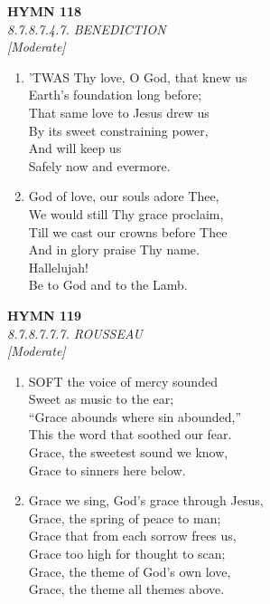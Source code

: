 \newpage
\begin{center}
    {\Large \textbf{HYMN 118}}
    \\
    \textit{8.7.8.7.4.7. BENEDICTION}
    \\
    \textit{\small [Moderate]}
\end{center}
\vspace{1em}

\begin{enumerate}
    \item 'TWAS Thy love, O God, that knew us \\
        Earth's foundation long before; \\
        That same love to Jesus drew us \\
        By its sweet constraining power, \\
        And will keep us \\
        Safely now and evermore.

    \item God of love, our souls adore Thee, \\
        We would still Thy grace proclaim, \\
        Till we cast our crowns before Thee \\
        And in glory praise Thy name. \\
        Hallelujah! \\
        Be to God and to the Lamb.

\end{enumerate}

\newpage
\begin{center}
    {\Large \textbf{HYMN 119}}
    \\
    \textit{8.7.8.7.7.7. ROUSSEAU}
    \\
    \textit{\small [Moderate]}
\end{center}
\vspace{1em}

\begin{enumerate}
    \item SOFT the voice of mercy sounded \\
        Sweet as music to the ear; \\
        ``Grace abounds where sin abounded,'' \\
        This the word that soothed our fear. \\
        Grace, the sweetest sound we know, \\
        Grace to sinners here below.

    \item Grace we sing, God's grace through Jesus, \\
        Grace, the spring of peace to man; \\
        Grace that from each sorrow frees us, \\
        Grace too high for thought to scan; \\
        Grace, the theme of God's own love, \\
        Grace, the theme all themes above.

\end{enumerate}

